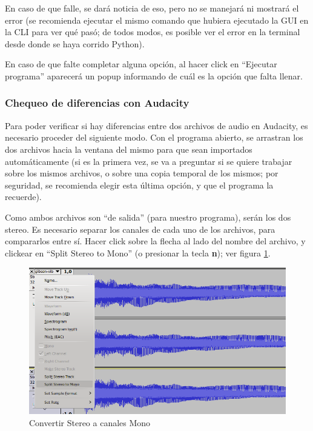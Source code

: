 \documentclass[a4paper,spanish,12pt]{article}
\begin{document}
En caso de que falle, se dará noticia de eso, pero no se manejará ni mostrará el error (se recomienda ejecutar el mismo comando que hubiera ejecutado la GUI en la CLI para ver qué pasó; de todos modos, es posible ver el error en la terminal desde donde se haya corrido Python).

En caso de que falte completar alguna opción, al hacer click en ``Ejecutar programa'' aparecerá un popup informando de cuál es la opción que falta llenar.

\newpage\subsubsection{Chequeo de diferencias con Audacity}
\label{subsec:chequeo-diferencias}
Para poder verificar si hay diferencias entre dos archivos de audio en Audacity, es necesario proceder del siguiente modo. Con el programa abierto, se arrastran los dos archivos hacia la ventana del mismo para que sean importados automáticamente (si es la primera vez, se va a preguntar si se quiere trabajar sobre los mismos archivos, o sobre una copia temporal de los mismos; por seguridad, se recomienda elegir esta última opción, y que el programa la recuerde).\vspace{\baselineskip}

Como ambos archivos son ``de salida'' (para nuestro programa), serán los dos stereo. Es necesario separar los canales de cada uno de los archivos, para compararlos entre sí. Hacer click sobre la flecha al lado del nombre del archivo, y clickear en ``Split Stereo to Mono'' (o presionar la tecla \textbf{n}); ver figura \ref{fig:audacity-split-stereo}.


\begin{figure}[H]
    \centering
    \includegraphics[scale=0.70]{imagenes/audacity-split-stereo.png}
    \caption{Convertir Stereo a canales Mono}
    \label{fig:audacity-split-stereo}
\end{figure}
\end{document}
